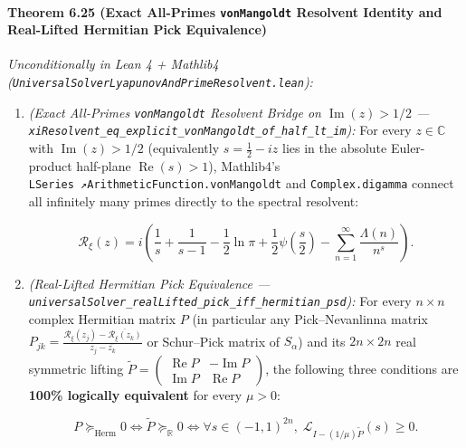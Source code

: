 \documentclass[
  11pt,
]{article}
\begin{document}
\paragraph{\texorpdfstring{Theorem 6.25 (Exact All-Primes
\texttt{vonMangoldt} Resolvent Identity and Real-Lifted Hermitian Pick
Equivalence)}{Theorem 6.25 (Exact All-Primes vonMangoldt Resolvent Identity and Real-Lifted Hermitian Pick Equivalence)}}\label{theorem-6.25-exact-all-primes-vonmangoldt-resolvent-identity-and-real-lifted-hermitian-pick-equivalence}

\emph{Unconditionally in Lean 4 + Mathlib4
(\texttt{UniversalSolverLyapunovAndPrimeResolvent.lean}):}

\begin{enumerate}
\def\labelenumi{\arabic{enumi}.}
\item
  \emph{(Exact All-Primes \texttt{vonMangoldt} Resolvent Bridge on
  \(\operatorname{Im}(z) > 1/2\) ---
  \texttt{xiResolvent\_eq\_explicit\_vonMangoldt\_of\_half\_lt\_im}):}
  For every \(z \in \mathbb{C}\) with \(\operatorname{Im}(z) > 1/2\)
  (equivalently \(s = \frac{1}{2} - iz\) lies in the absolute
  Euler-product half-plane \(\operatorname{Re}(s) > 1\)), Mathlib4's
  \texttt{LSeries\ ↗ArithmeticFunction.vonMangoldt} and
  \texttt{Complex.digamma} connect all infinitely many primes directly
  to the spectral resolvent:

  \[\mathcal{R}_\xi(z) = i\left(\frac{1}{s} + \frac{1}{s - 1} - \frac{1}{2}\ln\pi + \frac{1}{2}\psi\!\left(\frac{s}{2}\right) - \sum_{n=1}^\infty \frac{\Lambda(n)}{n^s}\right).\]
\item
  \emph{(Real-Lifted Hermitian Pick Equivalence ---
  \texttt{universalSolver\_realLifted\_pick\_iff\_hermitian\_psd}):} For
  every \(n \times n\) complex Hermitian matrix \(P\) (in particular any
  Pick--Nevanlinna matrix
  \(P_{jk} = \frac{\mathcal{R}_\xi(z_j) - \overline{\mathcal{R}_\xi(z_k)}}{z_j - \overline{z_k}}\)
  or Schur--Pick matrix of \(S_\alpha\)) and its \(2n \times 2n\) real
  symmetric lifting
  \(\widetilde{P} = \begin{pmatrix} \operatorname{Re} P & -\operatorname{Im} P \\ \operatorname{Im} P & \operatorname{Re} P \end{pmatrix}\),
  the following three conditions are \textbf{100\% logically equivalent}
  for every \(\mu > 0\):

  \[P \succeq_{\text{Herm}} 0 \iff \widetilde{P} \succeq_{\mathbb{R}} 0 \iff \forall s \in (-1, 1)^{2n},\; \mathcal{L}_{I - (1/\mu)\widetilde{P}}(s) \ge 0.\]


\end{enumerate}
\end{document}
